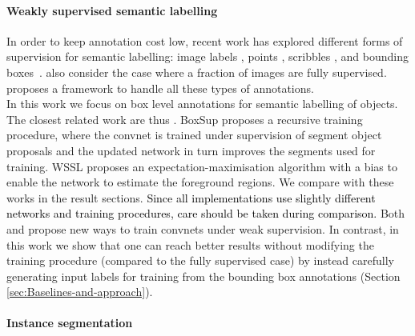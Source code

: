 \documentclass[10pt,english,british,twocolumn]{article}
\begin{document}
\paragraph{Weakly supervised semantic labelling}

In order to keep annotation cost low, recent work has explored different
forms of supervision for semantic labelling: image labels \cite{Pathak2015Iclrw,Pathak2015Iccv,Papandreou2015Iccv,Pinheiro2015Cvpr,Wei2015ArXiv},
points \cite{Bearman2015ArXiv}, scribbles \cite{Xu2015CvprWeakSegmentation,Lin2016CvprScribbleSup},
and bounding boxes~\cite{Dai2015Iccv,Papandreou2015Iccv}. \cite{Dai2015Iccv,Papandreou2015Iccv,Hong2015Nips}
also consider the case where a fraction of images are fully supervised.
\cite{Xu2015CvprWeakSegmentation} proposes a framework to handle
all these types of annotations.\\
In this work we focus on box level annotations for semantic labelling
of objects. The closest related work are thus \cite{Dai2015Iccv,Papandreou2015Iccv}.
BoxSup \cite{Dai2015Iccv} proposes a recursive training procedure,
where the convnet is trained under supervision of segment object proposals
and the updated network in turn improves the segments used for training.
WSSL \cite{Papandreou2015Iccv} proposes an expectation-maximisation
algorithm with a bias to enable the network to estimate the foreground
regions. We compare with these works in the result sections. \textcolor{black}{Since
all implementations use slightly different networks and training procedures,
care should be taken during comparison.} Both \cite{Dai2015Iccv}
and \cite{Papandreou2015Iccv} propose new ways to train convnets
under weak supervision. In contrast, in this work we show that one
can reach better results without modifying the training procedure
(compared to the fully supervised case) by instead carefully generating
input labels for training from the bounding box annotations (Section
\ref{sec:Baselines-and-approach}).

\paragraph{Instance segmentation}
\end{document}
